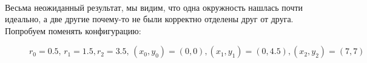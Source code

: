 \begin{figure}[h]
\end{figure}\\
Весьма неожиданный результат, мы видим, что одна окружность нашлась почти идеально, а две другие почему-то не были корректно отделены друг от друга. \newpage
Попробуем поменять конфигурацию: \\
\begin{figure}[h!]
\caption{$r_0 = 0.5, \, r_1 = 1.5, r_2 = 3.5, \, (x_0, y_0) = (0, 0), (x_1, y_1) = (0, 4.5), (x_2, y_2) = (7, 7)$}
\end{figure} \\ 
